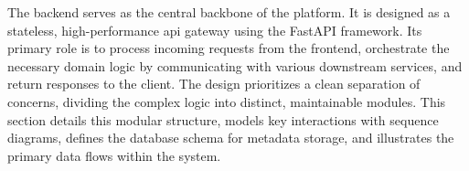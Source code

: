 The backend serves as the central backbone of the platform. It is designed as a stateless, high-performance \acs{api} gateway using the FastAPI framework. Its primary role is to process incoming requests from the frontend, orchestrate the necessary domain logic by communicating with various downstream services, and return responses to the client. The design prioritizes a clean separation of concerns, dividing the complex logic into distinct, maintainable modules. This section details this modular structure, models key interactions with sequence diagrams, defines the database schema for metadata storage, and illustrates the primary data flows within the system.
